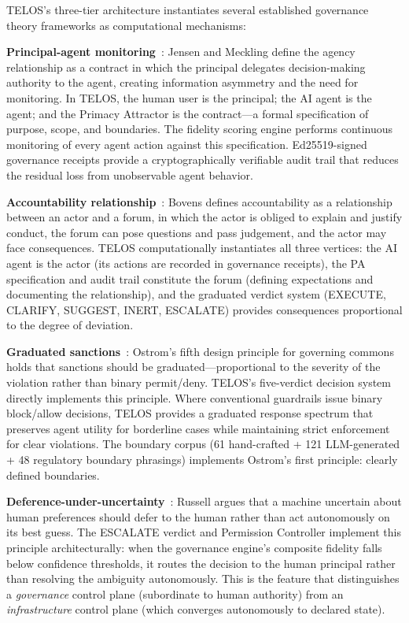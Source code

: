 \documentclass[11pt,twocolumn]{article}
\begin{document}
TELOS's three-tier architecture instantiates several established governance theory frameworks as computational mechanisms:

\textbf{Principal-agent monitoring}~\citep{jensen1976theory}: Jensen and Meckling define the agency relationship as a contract in which the principal delegates decision-making authority to the agent, creating information asymmetry and the need for monitoring. In TELOS, the human user is the principal; the AI agent is the agent; and the Primacy Attractor is the contract---a formal specification of purpose, scope, and boundaries. The fidelity scoring engine performs continuous monitoring of every agent action against this specification. Ed25519-signed governance receipts provide a cryptographically verifiable audit trail that reduces the residual loss from unobservable agent behavior.

\textbf{Accountability relationship}~\citep{bovens2007analysing}: Bovens defines accountability as a relationship between an actor and a forum, in which the actor is obliged to explain and justify conduct, the forum can pose questions and pass judgement, and the actor may face consequences. TELOS computationally instantiates all three vertices: the AI agent is the actor (its actions are recorded in governance receipts), the PA specification and audit trail constitute the forum (defining expectations and documenting the relationship), and the graduated verdict system (EXECUTE, CLARIFY, SUGGEST, INERT, ESCALATE) provides consequences proportional to the degree of deviation.

\textbf{Graduated sanctions}~\citep{ostrom1990governing}: Ostrom's fifth design principle for governing commons holds that sanctions should be graduated---proportional to the severity of the violation rather than binary permit/deny. TELOS's five-verdict decision system directly implements this principle. Where conventional guardrails issue binary block/allow decisions, TELOS provides a graduated response spectrum that preserves agent utility for borderline cases while maintaining strict enforcement for clear violations. The boundary corpus (61 hand-crafted + 121 LLM-generated + 48 regulatory boundary phrasings) implements Ostrom's first principle: clearly defined boundaries.

\textbf{Deference-under-uncertainty}~\citep{russell2019human}: Russell argues that a machine uncertain about human preferences should defer to the human rather than act autonomously on its best guess. The ESCALATE verdict and Permission Controller implement this principle architecturally: when the governance engine's composite fidelity falls below confidence thresholds, it routes the decision to the human principal rather than resolving the ambiguity autonomously. This is the feature that distinguishes a \emph{governance} control plane (subordinate to human authority) from an \emph{infrastructure} control plane (which converges autonomously to declared state).
\end{document}
